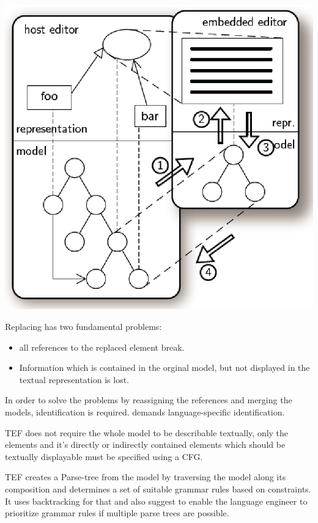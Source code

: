 \includegraphics[scale=0.7]{gfx/tef.png}

Replacing has two fundamental problems:
\begin{itemize}
	\item all references to the replaced element break.
	\item Information which is contained in the orginal model, but not displayed in the textual representation is lost.
\end{itemize}
In order to solve the problems by reassigning the references and merging the models, identification is required. \cite{TefPaper} demands language-specific identification. 

TEF does not require the whole model to be describable textually, only the elements and it's directly or indirectly contained elements which should be textually displayable must be specified using a CFG.

TEF creates a Parse-tree from the model by traversing the model along its composition and determines a set of suitable grammar rules based on constraints. It uses backtracking for that and \cite{TefPaper} also suggest to enable the language engineer to prioritize grammar rules if multiple parse trees are possible.